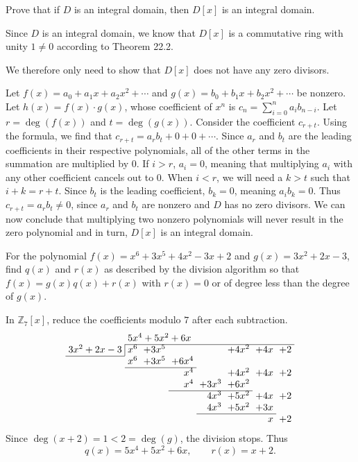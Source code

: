\documentclass[11pt]{article}
\begin{document}
\begin{problem}[22.24]
Prove that if $D$ is an integral domain, then $D[x]$ is an integral domain.
\end{problem}

\begin{solution}
Since $D$ is an integral domain, we know that $D[x]$ is a commutative ring
with unity $1 \neq 0$ according to Theorem 22.2.

We therefore only need to show that $D[x]$ does not have any zero divisors.

Let $f(x) = a_0 + a_1x + a_2x^2 + \cdots$ and
$g(x) = b_0 + b_1x + b_2x^2 + \cdots$ be nonzero.
Let $h(x) = f(x) \cdot g(x)$, whose coefficient of $x^n$ is
$c_n = \sum_{i=0}^{n} a_i b_{n-i}$.
Let $r = \deg(f(x))$ and $t = \deg(g(x))$. Consider the coefficient $c_{r+t}$.
Using the formula, we find that $c_{r+t} = a_rb_t + 0 + 0 + \cdots$.
Since $a_r$ and $b_t$ are the leading coefficients in their respective
polynomials, all of the other terms in the summation are multiplied by 0.
If $i > r$, $a_i = 0$, meaning that multiplying $a_i$ with any other
coefficient cancels out to 0.
When $i < r$, we will need a $k > t$ such that $i + k = r + t$.
Since $b_t$ is the leading coefficient, $b_k = 0$, meaning $a_ib_k = 0$.
Thus $c_{r+t} = a_rb_t \neq 0$, since $a_r$ and $b_t$ are nonzero
and $D$ has no zero divisors. We can now conclude that multiplying two
nonzero polynomials will never result in the zero polynomial and in turn,
$D[x]$ is an integral domain.
\end{solution}

\begin{problem}[23.2]
For the polynomial $f(x) = x^6 + 3x^5 + 4x^2 - 3x + 2$ and
$g(x) = 3x^2 + 2x - 3$, find $q(x)$ and $r(x)$ as described by the
division algorithm so that $f(x) = g(x)q(x) + r(x)$ with $r(x) = 0$
or of degree less than the degree of $g(x)$.
\end{problem}

\begin{solution}
In $\mathbb{Z}_7[x]$, reduce the coefficients modulo $7$ after each subtraction.
\[
\setlength{\arraycolsep}{3pt}
\begin{array}{r*{7}{r}}
    & \multicolumn{7}{l}{5x^4 + 5x^2 + 6x} \\
    \cline{2-8}
    \multicolumn{1}{r|}{3x^2 + 2x - 3}
        & x^6 & +3x^5 &       &       & +4x^2 & +4x & +2 \\
    \cline{1-1}
        & x^6 & +3x^5 & +6x^4 &       &       &     &    \\
    \cline{2-4}
        &     &       & x^4   &       & +4x^2 & +4x & +2 \\
        &     &       & x^4   & +3x^3 & +6x^2 &     &    \\
    \cline{4-6}
        &     &       &       & 4x^3  & +5x^2 & +4x & +2 \\
        &     &       &       & 4x^3  & +5x^2 & +3x &    \\
    \cline{5-7}
        &     &       &       &       &       & x   & +2
\end{array}
\]
Since $\deg(x+2)=1<2=\deg(g)$, the division stops. Thus
\[
\boxed{q(x)=5x^4+5x^2+6x,\qquad r(x)=x+2.}
\]
\end{solution}
\end{document}
